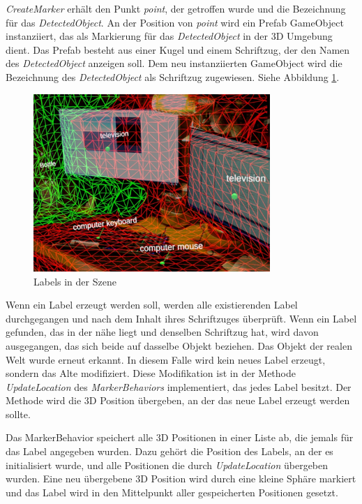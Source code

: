 \textit{CreateMarker} erhält den Punkt \textit{point}, der getroffen wurde und die Bezeichnung für das \textit{DetectedObject}. An der Position von \textit{point} wird ein Prefab GameObject instanziiert, das als Markierung für das \textit{DetectedObject} in der 3D Umgebung dient. Das Prefab besteht aus einer Kugel und einem Schriftzug, der den Namen des \textit{DetectedObject} anzeigen soll. Dem neu instanziierten GameObject wird die Bezeichnung des \textit{DetectedObject} als Schriftzug zugewiesen. Siehe Abbildung \ref{image:labels}.

\begin{figure}[H]
	\centering
	\includegraphics[width=0.8\textwidth]{images/ML_20201004_19.10.05_2.jpg}
	\caption[Labels in der Szene]{Labels in der Szene}
	\label{image:labels}
\end{figure}

Wenn ein Label erzeugt werden soll, werden alle existierenden Label durchgegangen und nach dem Inhalt ihres Schriftzuges überprüft. 
Wenn ein Label gefunden, das in der nähe liegt und denselben Schriftzug hat, wird davon ausgegangen, das sich beide auf dasselbe Objekt beziehen. Das Objekt der realen Welt wurde erneut erkannt. In diesem Falle wird kein neues Label erzeugt, sondern das Alte modifiziert. Diese Modifikation ist in der Methode \textit{UpdateLocation} des \textit{MarkerBehaviors} implementiert, das jedes Label besitzt. Der Methode wird die 3D Position übergeben, an der das neue Label erzeugt werden sollte.

Das MarkerBehavior speichert alle 3D Positionen in einer Liste ab, die jemals für das Label angegeben wurden. Dazu gehört die Position des Labels, an der es initialisiert wurde, und alle Positionen die durch \textit{UpdateLocation} übergeben wurden. Eine neu übergebene 3D Position wird durch eine kleine Sphäre markiert und das Label wird in den Mittelpunkt aller gespeicherten Positionen gesetzt.

